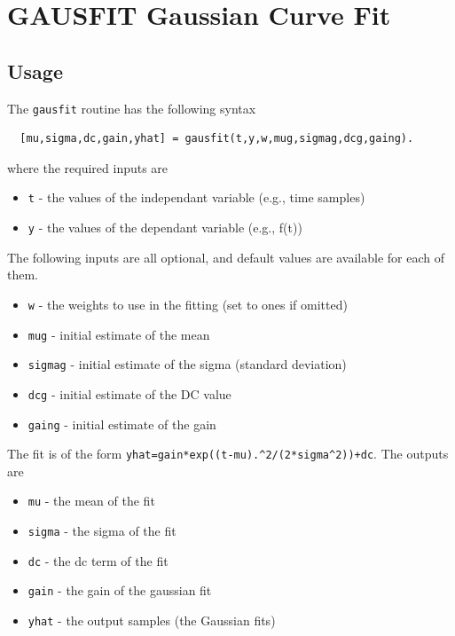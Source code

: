\section{GAUSFIT Gaussian Curve Fit}

\subsection{Usage}

The \verb|gausfit| routine has the following syntax
\begin{verbatim}
  [mu,sigma,dc,gain,yhat] = gausfit(t,y,w,mug,sigmag,dcg,gaing).
\end{verbatim}
where the required inputs are
\begin{itemize}
\item  \verb|t| - the values of the independant variable (e.g., time samples)

\item  \verb|y| - the values of the dependant variable (e.g., f(t))

\end{itemize}
The following inputs are all optional, and default values are
available for each of them.
\begin{itemize}
\item  \verb|w| - the weights to use in the fitting (set to ones if omitted)

\item  \verb|mug| - initial estimate of the mean

\item  \verb|sigmag| - initial estimate of the sigma (standard deviation)

\item  \verb|dcg| - initial estimate of the DC value

\item  \verb|gaing| - initial estimate of the gain

\end{itemize}
The fit is of the form \verb|yhat=gain*exp((t-mu).^2/(2*sigma^2))+dc|.
The outputs are 
\begin{itemize}
\item  \verb|mu| - the mean of the fit

\item  \verb|sigma| - the sigma of the fit

\item  \verb|dc| - the dc term of the fit

\item  \verb|gain| - the gain of the gaussian fit

\item  \verb|yhat| - the output samples (the Gaussian fits)

\end{itemize}
